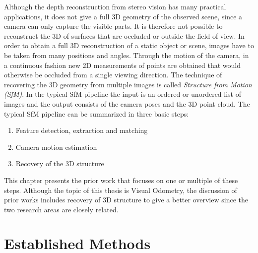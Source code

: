 	Although the depth reconstruction from stereo vision has many practical applications, it does not give a full 3D geometry of the observed scene, since a camera can only capture the visible parts.
	It is therefore not possible to reconstruct the 3D of surfaces that are occluded or outside the field of view. 
	In order to obtain a full 3D reconstruction of a static object or scene, images have to be taken from many positions and angles.
	Through the motion of the camera, in a continuous fashion new 2D measurements of points are obtained that would otherwise be occluded from a single viewing direction.
	The technique of recovering the 3D geometry from multiple images is called \emph{Structure from Motion (SfM)}.
	In the typical SfM pipeline the input is an ordered or unordered list of images and the output consists of the camera poses and the 3D point cloud.
	The typical SfM pipeline can be summarized in three basic steps:
	\begin{enumerate}
		\item Feature detection, extraction and matching
		\item Camera motion estimation
		\item Recovery of the 3D structure
	\end{enumerate}
	This chapter presents the prior work that focuses on one or multiple of these steps.
	Although the topic of this thesis is Visual Odometry, the discussion of prior works includes recovery of 3D structure to give a better overview since the two research areas are closely related. 
	
%	
%	

	\section{Established Methods}
	

